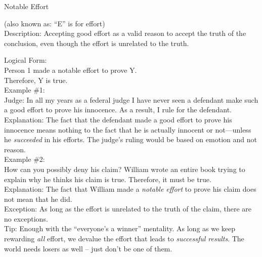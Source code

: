 \documentclass[a4paper,12pt,single,pdftex]{scrbook}
\begin{document}
  

Notable Effort
    
      (also known as: “E” is for effort)
    \\

  
    Description: Accepting good effort as a valid reason to accept the truth of the conclusion, even though the effort is unrelated to the truth.

    
      Logical Form:
    \\

    
      Person 1 made a notable effort to prove Y.
    \\

    
      Therefore, Y is true.
    \\

    
      Example \#1:
    \\

    
      Judge: In all my years as a federal judge I have never seen a defendant make such a good effort to prove his innocence.  As a result, I rule for the defendant.
    \\

    
      Explanation: The fact that the defendant made a good effort to prove his innocence means nothing to the fact that he is actually innocent or not—unless he {\it succeeded }in his efforts.  The judge's ruling would be based on emotion and not reason.
    \\

    
      Example \#2:
    \\

    
      How can you possibly deny his claim?  William wrote an entire book trying to explain why he thinks his claim is true.  Therefore, it must be true.
    \\

    
      Explanation: The fact that William made a {\it notable effort}  to prove his claim does not mean that he did.
    \\

    
      Exception: As long as the effort is unrelated to the truth of the claim, there are no exceptions.
    \\

    
      Tip: Enough with the “everyone’s a winner” mentality.  As long as we keep rewarding {\it all} effort, we devalue the effort that leads to {\it successful results}.  The world needs losers as well -- just don’t be one of them.
    \\
\end{document}
